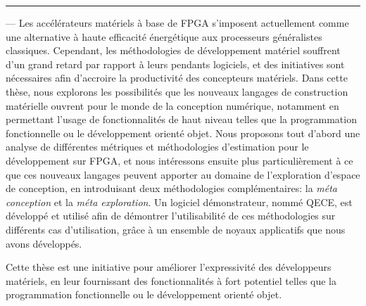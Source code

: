 \vspace{-0.25cm}
\hrule height 1pt
\vspace{0.3cm}



\vspace*{\fill}
{\normalsize
{} --- Les accélérateurs matériels à base de FPGA s'imposent actuellement comme une alternative à haute efficacité énergétique aux processeurs généralistes classiques.
Cependant, les méthodologies de développement matériel souffrent d'un grand retard par rapport à leurs pendants logiciels, et des initiatives sont nécessaires afin d'accroire la productivité des concepteurs matériels.
Dans cette thèse, nous explorons les possibilités que les nouveaux langages de construction matérielle ouvrent pour le monde de la conception numérique, notamment en permettant l'usage de fonctionnalités de haut niveau telles que la programmation fonctionnelle ou le développement orienté objet.
Nous proposons tout d'abord une analyse de différentes métriques et méthodologies d'estimation pour le développement sur FPGA, et nous intéressons ensuite plus particulièrement à ce que ces nouveaux langages peuvent apporter au domaine de l'exploration d'espace de conception, en introduisant deux méthodologies complémentaires: la {\it méta conception} et la {\it méta exploration}.
Un logiciel démonstrateur, nommé QECE, est développé et utilisé afin de démontrer l'utilisabilité de ces méthodologies sur différents cas d'utilisation, gr\^ace à un ensemble de noyaux applicatifs que nous avons développés.

Cette thèse est une initiative pour améliorer l'expressivité des développeurs matériels, en leur fournissant des fonctionnalités à fort potentiel telles que la programmation fonctionnelle ou le développement orienté objet.
}
\vspace*{\fill}%

